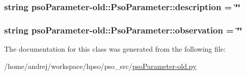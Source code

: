 \hypertarget{classpsoParameter-old_1_1PsoParameter_029921a2843344aa1b6ff92b5e8801e0}{
\subsubsection{\setlength{\rightskip}{0pt plus 5cm}string psoParameter-old::PsoParameter::description = \char`\"{}\char`\"{}}}
\label{classpsoParameter-old_1_1PsoParameter_029921a2843344aa1b6ff92b5e8801e0}


\hypertarget{classpsoParameter-old_1_1PsoParameter_183b70f191f660001b38d24b7016b9df}{
\subsubsection{\setlength{\rightskip}{0pt plus 5cm}string psoParameter-old::PsoParameter::observation = \char`\"{}\char`\"{}}}
\label{classpsoParameter-old_1_1PsoParameter_183b70f191f660001b38d24b7016b9df}




The documentation for this class was generated from the following file:\begin{CompactItemize}
\item 
/home/andrej/workspace/hpso/pso\_\-src/\hyperlink{psoParameter-old_8py}{psoParameter-old.py}\end{CompactItemize}
